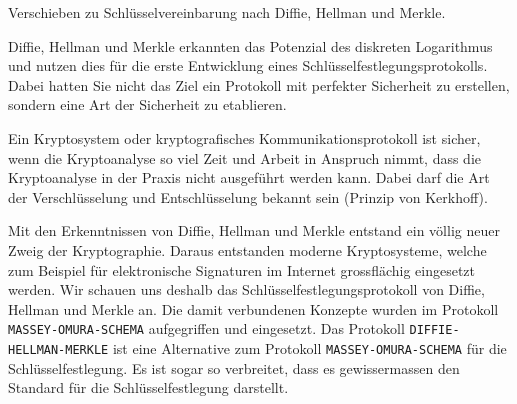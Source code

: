Verschieben zu Schlüsselvereinbarung nach Diffie, Hellman und Merkle.

Diffie, Hellman und Merkle erkannten das Potenzial des diskreten Logarithmus und nutzen dies für die erste Entwicklung eines Schlüsselfestlegungsprotokolls. Dabei hatten Sie nicht das Ziel ein Protokoll mit perfekter Sicherheit zu erstellen, sondern eine  Art der Sicherheit zu etablieren.

\begin{definition}
	Ein Kryptosystem oder kryptografisches Kommunikationsprotokoll ist sicher, wenn die Kryptoanalyse so viel Zeit und Arbeit in Anspruch nimmt, dass die Kryptoanalyse in der Praxis nicht ausgeführt werden kann. Dabei darf die Art der Verschlüsselung und Entschlüsselung bekannt sein (Prinzip von Kerkhoff).
\end{definition}

Mit den Erkenntnissen von Diffie, Hellman und Merkle entstand ein völlig neuer Zweig der Kryptographie. Daraus entstanden moderne Kryptosysteme, welche zum Beispiel für elektronische Signaturen im Internet grossflächig eingesetzt werden. Wir schauen uns deshalb das Schlüsselfestlegungsprotokoll von Diffie, Hellman und Merkle an. Die damit verbundenen Konzepte wurden im Protokoll \texttt{MASSEY-OMURA-SCHEMA} aufgegriffen und eingesetzt. Das Protokoll \texttt{DIFFIE-HELLMAN-MERKLE} ist eine Alternative zum Protokoll \texttt{MASSEY-OMURA-SCHEMA} für die Schlüsselfestlegung. Es ist sogar so verbreitet, dass es gewissermassen den Standard für die Schlüsselfestlegung darstellt.